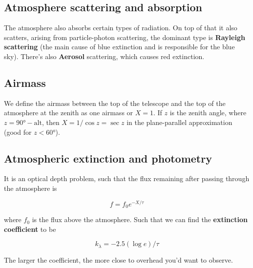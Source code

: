 \documentclass[a4paper]{article}
\begin{document}
\subsection{Atmosphere scattering and absorption}

The atmosphere also absorbs certain types of radiation. On top of that it also scatters, arising from particle-photon scattering, the dominant type is \textbf{Rayleigh scattering} (the main cause of blue extinction and is responsible for the blue sky). There's also \textbf{Aerosol} scattering, which causes red extinction.

\subsection{Airmass}

We define the airmass between the top of the telescope and the top of the atmosphere at the zenith as one airmass or $X=1$. If $z$ is the zenith angle, where $z=90\si{\degree}-\text{alt}$, then $X=1/\cos z=\sec z$ in the plane-parallel approximation (good for $z<60\si{\degree}$).

\subsection{Atmospheric extinction and photometry}

It is an optical depth problem, such that the flux remaining after passing through the atmosphere is 

\begin{equation*}
    f=f_0e^{-X/\tau}
\end{equation*}

where $f_0$ is the flux above the atmosphere. Such that we can find the \textbf{extinction coefficient} to be

\begin{equation*}
    k_\lambda=-2.5(\log e)/\tau
\end{equation*}

The larger the coefficient, the more close to overhead you'd want to observe.
\end{document}
